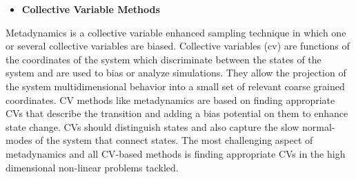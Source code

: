 \begin{itemize}
\item \textbf{Collective Variable Methods}  
\end{itemize}

Metadynamics is a collective variable enhanced sampling technique in which one or several 
collective variables are biased. Collective variables (\gls{cv}) are functions of the coordinates of the 
system which discriminate between the states of the system and are used to bias 
or analyze simulations. They allow the projection of the system multidimensional behavior into a 
small  set of relevant coarse grained coordinates. CV methods like metadynamics are based on 
finding appropriate  CVs that describe the transition and adding a bias potential on them to 
enhance state change. CVs should distinguish states and also 
 capture the slow normal-modes of the system that connect states. The most challenging aspect of 
metadynamics and all CV-based methods is finding appropriate CVs in the high  dimensional 
non-linear problems tackled.

